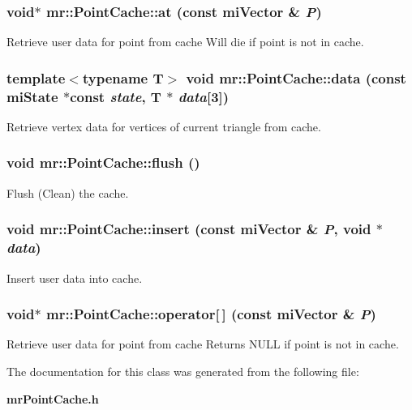 \subsubsection{\setlength{\rightskip}{0pt plus 5cm}void$\ast$ mr::Point\-Cache::at (const mi\-Vector \& {\em P})\hspace{0.3cm}{\tt  [inline]}}\label{classmr_1_1PointCache_a4}


Retrieve user data for point from cache Will die if point is not in cache. 
\subsubsection{\setlength{\rightskip}{0pt plus 5cm}template$<$typename T$>$ void mr::Point\-Cache::data (const mi\-State $\ast$const {\em state}, T $\ast$ {\em data}[3])\hspace{0.3cm}{\tt  [inline]}}\label{classmr_1_1PointCache_a6}


Retrieve vertex data for vertices of current triangle from cache. 
\subsubsection{\setlength{\rightskip}{0pt plus 5cm}void mr::Point\-Cache::flush ()\hspace{0.3cm}{\tt  [inline]}}\label{classmr_1_1PointCache_a0}


Flush (Clean) the cache. 

\subsubsection{\setlength{\rightskip}{0pt plus 5cm}void mr::Point\-Cache::insert (const mi\-Vector \& {\em P}, void $\ast$ {\em data})\hspace{0.3cm}{\tt  [inline]}}\label{classmr_1_1PointCache_a3}


Insert user data into cache. 

\subsubsection{\setlength{\rightskip}{0pt plus 5cm}void$\ast$ mr::Point\-Cache::operator[$\,$] (const mi\-Vector \& {\em P})\hspace{0.3cm}{\tt  [inline]}}\label{classmr_1_1PointCache_a5}


Retrieve user data for point from cache Returns NULL if point is not in cache. 

The documentation for this class was generated from the following file:\begin{CompactItemize}
\item 
{\bf mr\-Point\-Cache.h}\end{CompactItemize}
